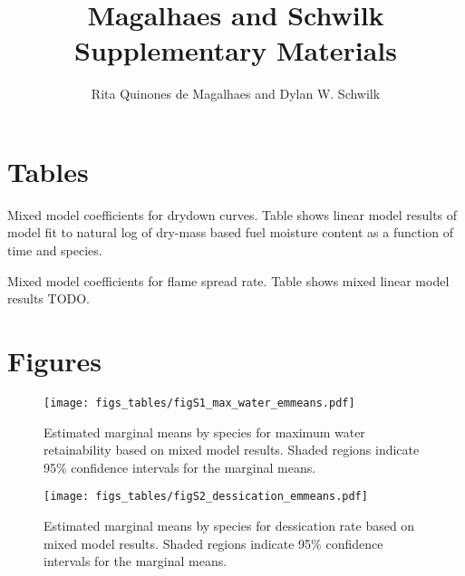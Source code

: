 \documentclass[letterpaper]{article}
\title{Magalhaes and Schwilk Supplementary Materials}
\author{Rita Quinones de Magalhaes and Dylan W. Schwilk}
\begin{document}
\maketitle

\section{Tables}

\begin{table}[h]
  \caption{Mixed model coefficients for drydown curves. Table shows linear model results of model fit to  natural log of dry-mass based fuel moisture content as a function of time and species.} 
  \label{tabS1}
\centering

\end{table}

\begin{table}[h]
  \caption{Mixed model coefficients for flame spread rate. Table shows mixed linear model results  TODO.} 
  \label{tabS3}
\centering

\end{table}

\section{Figures}

\begin{figure}[h]
  \centering
  \label{fig-S1}

  \texttt{[image: figs\_tables/figS1\_max\_water\_emmeans.pdf]}
\caption{Estimated marginal means by species for maximum water retainability based on mixed model results. Shaded regions indicate 95\% confidence intervals for the marginal means.}

\end{figure}


\begin{figure}[h]
  \centering
  \label{fig-S2}
\texttt{[image: figs\_tables/figS2\_dessication\_emmeans.pdf]}
\caption{Estimated marginal means by species for dessication rate based on mixed model results. Shaded regions indicate 95\% confidence intervals for the marginal means.}
\end{figure}
\end{document}

